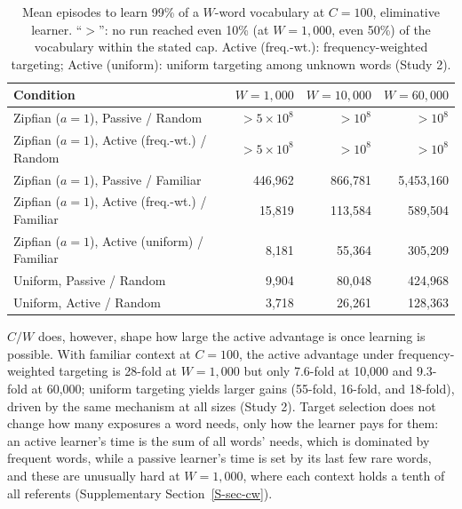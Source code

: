 \documentclass[a4paper,natbib,man]{apa6}
\begin{document}
\begin{table}[h]
\centering
\caption{\label{tab-m10k-c100} Mean episodes to learn 99\% of a $W$-word vocabulary at $C=100$, eliminative learner. ``$>$'': no run reached even 10\% (at $W=1{,}000$, even 50\%) of the vocabulary within the stated cap. Active (freq.-wt.): frequency-weighted targeting; Active (uniform): uniform targeting among unknown words (Study 2).}
\footnotesize
\begin{tabular}{lrrr}
\hline
Condition & $W=1{,}000$ & $W=10{,}000$ & $W=60{,}000$ \\
\hline
Zipfian ($a=1$), Passive / Random & $>5 \times 10^8$ & $>10^8$ & $>10^8$ \\
Zipfian ($a=1$), Active (freq.-wt.) / Random & $>5 \times 10^8$ & $>10^8$ & $>10^8$ \\
Zipfian ($a=1$), Passive / Familiar & 446{,}962 & 866{,}781 & 5{,}453{,}160 \\
Zipfian ($a=1$), Active (freq.-wt.) / Familiar & 15{,}819 & 113{,}584 & 589{,}504 \\
Zipfian ($a=1$), Active (uniform) / Familiar & 8{,}181 & 55{,}364 & 305{,}209 \\
Uniform, Passive / Random & 9{,}904 & 80{,}048 & 424{,}968 \\
Uniform, Active / Random & 3{,}718 & 26{,}261 & 128{,}363 \\
\hline
\end{tabular}
\end{table}

$C/W$ does, however, shape how large the active advantage is once learning is possible. With familiar context at $C=100$, the active advantage under frequency-weighted targeting is 28-fold at $W=1{,}000$ but only 7.6-fold at 10,000 and 9.3-fold at 60,000; uniform targeting yields larger gains (55-fold, 16-fold, and 18-fold), driven by the same mechanism at all sizes (Study 2). Target selection does not change how many exposures a word needs, only how the learner pays for them: an active learner's time is the sum of all words' needs, which is dominated by frequent words, while a passive learner's time is set by its last few rare words, and these are unusually hard at $W=1{,}000$, where each context holds a tenth of all referents (Supplementary Section~\ref{S-sec-cw}).
\end{document}
